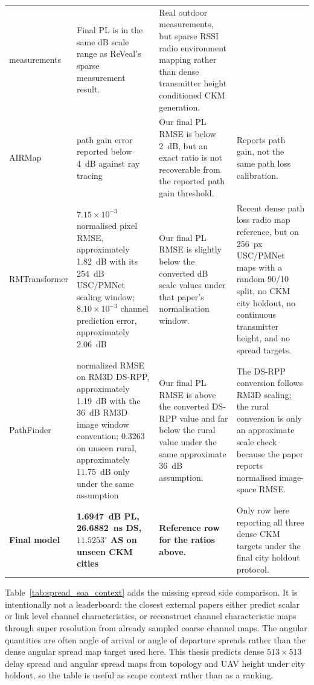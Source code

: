 \begin{table}[!htbp]
\begin{tabularx}{\textwidth}{>{\raggedright\arraybackslash}p{}
>{\raggedright\arraybackslash}p{}
>{\raggedright\arraybackslash}p{}
>{\raggedright\arraybackslash}X}
measurements &
Final PL is in the same dB scale range as ReVeal's sparse measurement result. &
Real outdoor measurements, but sparse RSSI radio environment mapping rather than
dense transmitter height conditioned CKM generation. \\
AIRMap \cite{airmap2025} &
path gain error reported below \SI{4}{dB} against ray tracing &
Our final PL RMSE is below \SI{2}{dB}, but an exact ratio is not recoverable
from the reported path gain threshold. &
Reports path gain, not the same path loss calibration. \\
RMTransformer \cite{rmtransformer2025} &
\(7.15\times10^{-3}\) normalised pixel RMSE, approximately \SI{1.82}{dB}
with its \SI{254}{dB} USC/PMNet scaling window; \(8.10\times10^{-3}\)
channel prediction error, approximately \SI{2.06}{dB} &
Our final PL RMSE is slightly below the converted dB scale values under that
paper's normalisation window. &
Recent dense path loss radio map reference, but on \SI{256}{px} USC/PMNet maps
with a random 90/10 split, no CKM city holdout, no continuous transmitter height, and no
spread targets. \\
PathFinder \cite{pathfinder2025} &
0.0331 normalized RMSE on RM3D DS-RPP, approximately \SI{1.19}{dB} with the
\SI{36}{dB} RM3D image window convention; 0.3263 on unseen rural, approximately \SI{11.75}{dB}
only under the same assumption &
Our final PL RMSE is above the converted DS-RPP value and far below the rural
value under the same approximate \SI{36}{dB} assumption. &
The DS-RPP conversion follows RM3D scaling; the rural conversion is only an
approximate scale check because the paper reports normalised image-space RMSE. \\
\textbf{Final model} &
\textbf{\SI{1.6947}{dB} PL, \SI{26.6882}{ns} DS, \(11.5253^\circ\) AS on unseen CKM cities} &
\textbf{Reference row for the ratios above.} &
Only row here reporting all three dense CKM targets under the final
city holdout protocol. \\
\bottomrule
\end{tabularx}
\endgroup
\end{table}

Table~\ref{tab:spread_soa_context} adds the missing spread side comparison.
It is intentionally not a leaderboard: the closest external papers either
predict scalar or link level channel characteristics, or reconstruct channel
characteristic maps through super resolution from already sampled coarse
channel maps. The angular quantities are often angle of arrival or angle of
departure spreads rather than the dense angular spread map target used here.
This thesis predicts dense \(513\times513\) delay spread and angular spread
maps from topology and UAV height under city holdout, so the table is useful as
scope context rather than as a ranking.

